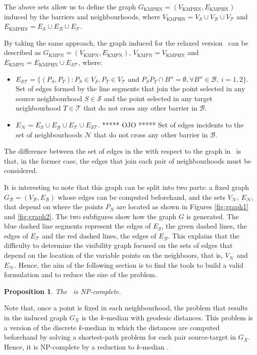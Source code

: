 \documentclass[a4paper,  review, authoryear, 1p.]{elsarticle}
\newcommand{\KMPHN}{{\sf{H-KMPHN}}}
\newcommand{\KMPN}{{\sf{H-KMPN}\xspace }}
\newcommand{\B}{{\mathcal B}}
\newcommand{\VB}{{V^{}_{\mathcal B}}}
\newcommand{\EB}{{E^{}_{\mathcal B}}}
\newcommand{\VS}{{V^{}_{\mathcal S}}}
\newcommand{\ES}{{E^{}_{\mathcal S}}}
\newcommand{\VT}{{V^{}_{\mathcal T}}}
\newcommand{\ET}{{E^{}_{\mathcal T}}}
\newcommand{\VN}{{V^{}_{\mathcal N}}}
\newcommand{\EN}{{E^{}_{\mathcal N}}}
\newcommand{\EST}{{E^{}_{\mathcal S\mathcal T}}}
\newcommand{\GKMPHN}{{G_{\text{KMPHN}}}}
\newcommand{\VKMPHN}{{V_{\text{KMPHN}}}}
\newcommand{\EKMPHN}{{E_{\text{KMPHN}}}}
\newcommand{\GKMPN}{{G_{\text{KMPN}}}}
\newcommand{\VKMPN}{{V_{\text{KMPN}}}}
\newcommand{\EKMPN}{{E_{\text{KMPN}}}}
\newtheorem{prop}{Proposition}
\newcommand{\JP}[1]{{\color{armygreen}#1}}
\newcommand{\CV}[1]{{\color{blue}#1}}
\begin{document}
	The above sets allow us to define the graph $\GKMPHN= (\VKMPHN, \EKMPHN)$ induced by the barriers and neighbourhoods, where $\VKMPHN=\VS\cup \VB\cup\VT$ and $\EKMPHN=\ES\cup\EB \cup\ET$. 
	
	By taking the same approach, the graph induced for the relaxed version \KMPN \ can be described as $\GKMPN= (\VKMPN, \EKMPN)$, $\VKMPN= \VKMPHN$ and $\EKMPN=\EKMPHN\cup \EST$, where:
	\begin{itemize}
		\item $\EST=\{(P_S, P_T):P_S\in\VS, P_T\in\VT \text{ and } \overline{P_SP_T}\cap B''=\emptyset,\forall B''\in\B,\:i=1,2\}$. Set of edges formed by the line segments that join the point selected in any source neighbourhood $S\in \mathcal{S}$ and the point selected in any target neighbourhood $T\in \mathcal{T}$ \CV{that do not cross any other barrier in $\B$.}
		\item \JP{$\EN=\ES\cup\EB \cup\ET\cup\EST.$ ***** OJO ***** Set of edges incidents to the set of neighbourhoods $\mathcal N$ that do not cross any other barrier in $\B$.}
	\end{itemize}
	

	\CV{The difference between the set of edges in the \KMPHN \xspace with respect to the graph in \KMPN \ is that, in the former case, the edges that join each pair of neighbourhoods must be considered.}
	
	\JP{It is interesting to note that this graph can be split into two parts: a fixed graph $G_\B=(\VB,\EB)$ whose edges can be computed beforehand, and the sets $\VN$, $\EN$, that depend on where the points $P_N$ are located as shown in Figures \ref{fig:graph1} and \ref{fig:graph2}.  The two subfigures show how the graph $G$ is generated. The blue dashed line segments represent the edges of $\ES$, the green dashed lines, the edges of $\ET$ and the red dashed lines, the edges of $\EB$. This explains that the difficulty to determine the visibility graph focused on the sets of edges that depend on the location of the variable points on the neighboors, that is, $\VN$ and $\EN$. Hence, the aim of the following section is to find the tools to build a valid formulation and  to reduce the size of the problem.}

	
	
	\CV{
		\begin{prop}
			The \KMPN \ is NP-complete.
		\end{prop}
		
	Note that, once a point is fixed in each neighbourhood, the problem that results in the induced graph $G_X$ is the $k$-median with geodesic distances. This problem is a version of the discrete $k$-median  in which the distances are computed beforehand by solving a shortest-path problem for each pair source-target in $G_X$. Hence, it is NP-complete by a reduction to $k$-median \citep{kariv1979}.}
	
\end{document}
